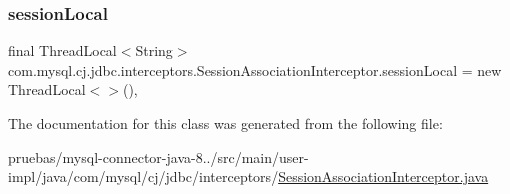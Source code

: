 \subsubsection{\texorpdfstring{session\+Local}{sessionLocal}}
{\footnotesize\ttfamily final Thread\+Local$<$String$>$ com.\+mysql.\+cj.\+jdbc.\+interceptors.\+Session\+Association\+Interceptor.\+session\+Local = new Thread\+Local$<$$>$()\hspace{0.3cm}{\ttfamily [static]}, {\ttfamily [protected]}}



The documentation for this class was generated from the following file\+:\begin{DoxyCompactItemize}
\item 
pruebas/mysql-\/connector-\/java-\/8../src/main/user-\/impl/java/com/mysql/cj/jdbc/interceptors/\mbox{\hyperlink{_session_association_interceptor_8java}{Session\+Association\+Interceptor.\+java}}\end{DoxyCompactItemize}
